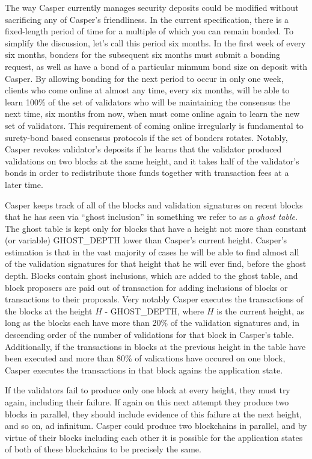 \documentclass[11pt,a4paper]{article}
\begin{document}
The way Casper currently manages security deposits could be modified without sacrificing any of Casper's friendliness. In the current specification, there is a fixed-length period of time for a multiple of which you can remain bonded. To simplify the discussion, let's call this period six months. In the first week of every six months, bonders for the subsequent six months must submit a bonding request, as well as have a bond of a particular minmum bond size on deposit with Casper. By allowing bonding for the next period to occur in only one week, clients who come online at almost any time, every six months, will be able to learn 100\% of the set of validators who will be maintaining the consensus the next time, six months from now, when must come online again to learn the new set of validators. This requirement of coming online irregularly is fundamental to surety-bond based consensus protocols if the set of bonders rotates. Notably, Casper revokes validator's deposits if he learns that the validator produced validations on two blocks at the same height, and it takes half of the validator's bonds in order to redistribute those funds together with transaction fees at a later time.

Casper keeps track of all of the blocks and validation signatures on recent blocks that he has seen via ``ghost inclusion'' in something we refer to as a \emph{ghost table}. The ghost table is kept only for blocks that have a height not more than constant (or variable) GHOST\_DEPTH lower than Casper's current height. Casper's estimation is that in the vast majority of cases he will be able to find almost all of the validation signatures for that height that he will ever find, before the ghost depth. Blocks contain ghost inclusions, which are added to the ghost table, and block proposers are paid out of transaction for adding inclusions of blocks or transactions to their proposals. Very notably Casper executes the transactions of the blocks at the height $H$ - GHOST\_DEPTH, where $H$ is the current height, as long as the blocks each have more than 20\% of the validation signatures and, in descending order of the number of validations for that block in Casper's table. Additionally, if the transactions in blocks at the previous height in the table have been executed and more than 80\% of valications have occured on one block, Casper executes the transactions in that block agains the application state.

If the validators fail to produce only one block at every height, they must try again, including their failure. If again on this next attempt they produce two blocks in parallel, they should include evidence of this failure at the next height, and so on, ad infinitum. Casper could produce two blockchains in parallel, and by virtue of their blocks including each other it is possible for the application states of both of these blockchains to be precisely the same. 
\end{document}
